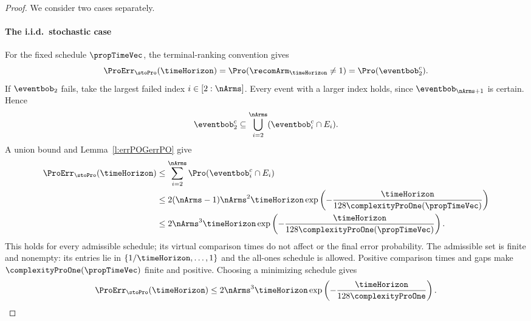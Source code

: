 \begin{proof} %
We consider two cases separately.
	\paragraph{The i.i.d.~stochastic case}
For the fixed schedule $\propTimeVec$, the terminal-ranking
convention gives
\[
\ProErr_{\stoPro}(\timeHorizon)
=\Pro(\recomArm_{\timeHorizon}\neq1)
=\Pro(\eventbob_2^c).
\]
If $\eventbob_2$ fails, take the largest failed index $i\in[2:\nArms]$.
Every event with a larger index holds, since
$\eventbob_{\nArms+1}$ is certain.
Hence
\[
\eventbob_2^c\subseteq
\bigcup_{i=2}^{\nArms}(\eventbob_i^c\cap E_i).
\]
A union bound and Lemma~\ref{l:errPOGerrPO} give
\begin{align*}
\ProErr_{\stoPro}(\timeHorizon)
&\leq\sum_{i=2}^{\nArms}\Pro(\eventbob_i^c\cap E_i)\\
&\leq2(\nArms-1)\nArms^2\timeHorizon
\exp\left(-\frac{\timeHorizon}
{128\complexityProOne(\propTimeVec)}\right)\\
&\leq2\nArms^3\timeHorizon
\exp\left(-\frac{\timeHorizon}
{128\complexityProOne(\propTimeVec)}\right).
\end{align*}
This holds for every admissible schedule; its virtual comparison
times do not affect \Pone{} or the final error probability. The admissible set is finite and nonempty:
its entries lie in $\{1/\timeHorizon,\ldots,1\}$ and the all-ones
schedule is allowed. Positive comparison times and gaps make
$\complexityProOne(\propTimeVec)$ finite and positive.
Choosing a minimizing schedule gives
\[
\ProErr_{\stoPro}(\timeHorizon)
\leq2\nArms^3\timeHorizon
\exp\left(-\frac{\timeHorizon}{128\complexityProOne}\right).
\]


\end{proof}
